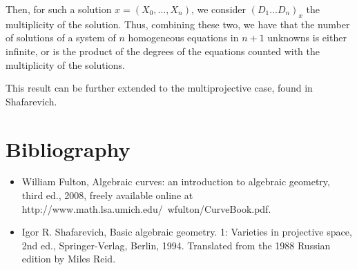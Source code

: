 \documentclass[10pt]{article}
\begin{document}
Then, for such a solution $x = (X_0,...,X_n)$, we consider $(D_1...D_n)_x$ the multiplicity of the solution. Thus, combining these two, we have that the number of solutions of a system of $n$ homogeneous equations in $n+1$ unknowns is either infinite, or is the product of the degrees of the equations counted with the multiplicity of the solutions.

This result can be further extended to the multiprojective case, found in Shafarevich.

\section{Bibliography}

\begin{itemize}

\item[] William Fulton, Algebraic curves: an introduction to algebraic geometry, third ed., 2008, freely available online at http://www.math.lsa.umich.edu/~wfulton/CurveBook.pdf.\\
\item[] Igor R. Shafarevich, Basic algebraic geometry. 1: Varieties in projective space, 2nd ed., Springer-Verlag, Berlin, 1994. Translated from the 1988 Russian edition by Miles Reid.

\end{itemize}
\end{document}
